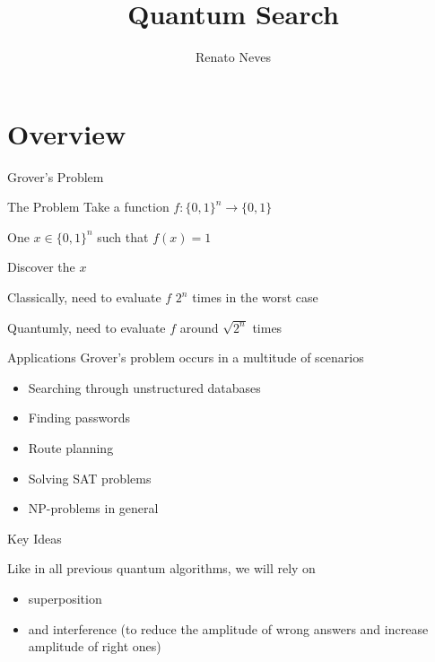\documentclass{beamer}
\author[Renato Neves]{Renato Neves}
\date{}
\begin{document}
\title{Quantum Search}

\frame[plain]{\titlepage}

\section{Overview}

\begin{frame}{Grover's Problem}

        \begin{block}{The Problem}
        Take a function $f : \{0,1\}^n \to \{0,1\}$

        One $x \in \{0,1\}^n$ such that $f(x) = 1$ 

        Discover the $x$  
        \end{block}

        Classically, need to evaluate $f$ $2^n$ times in the worst case 
        \pause

        \pause
        Quantumly, need to evaluate $f$ around \alert{$\sqrt{2^n}$} times
\end{frame}

\begin{frame}{Applications}
        Grover's problem occurs in a multitude of scenarios
        \begin{itemize}
                \item Searching through unstructured databases
                \item Finding passwords
                \item Route planning
                \item Solving SAT problems
                \item \alert{NP-problems in general}
        \end{itemize}
\end{frame}

\begin{frame}{Key Ideas}

        Like in all previous quantum algorithms, we will rely on
        \begin{itemize}
        \item superposition
        \item and interference (to reduce the amplitude of wrong
                answers and increase amplitude of right ones)
        \end{itemize}
\end{frame}
\end{document}
